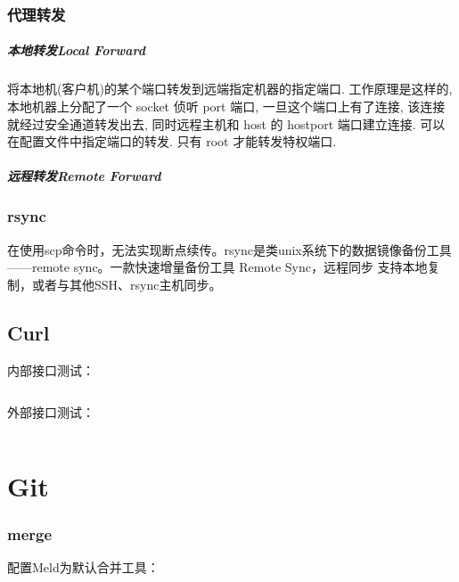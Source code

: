 \documentclass[letter]{book}
\begin{document}
\subsection{代理转发}

\paragraph{本地转发Local Forward}将本地机(客户机)的某个端口转发到远端指定机器的指定端口. 工作原理是这样的, 本地机器上分配了一个 socket 侦听 port 端口, 一旦这个端口上有了连接, 该连接就经过安全通道转发出去, 同时远程主机和 host 的 hostport 端口建立连接. 可以在配置文件中指定端口的转发. 只有 root 才能转发特权端口. 

\paragraph{远程转发Remote Forward}

\subsection{rsync}

在使用scp命令时，无法实现断点续传。rsync是类unix系统下的数据镜像备份工具——remote sync。一款快速增量备份工具 Remote Sync，远程同步 支持本地复制，或者与其他SSH、rsync主机同步。

\section{Curl}

内部接口测试：

\begin{lstlisting}[language=Bash]

\end{lstlisting}

外部接口测试：


\begin{lstlisting}[language=Bash]

\end{lstlisting}

\chapter{Git}

\subsection{merge}

配置Meld为默认合并工具：
\end{document}
